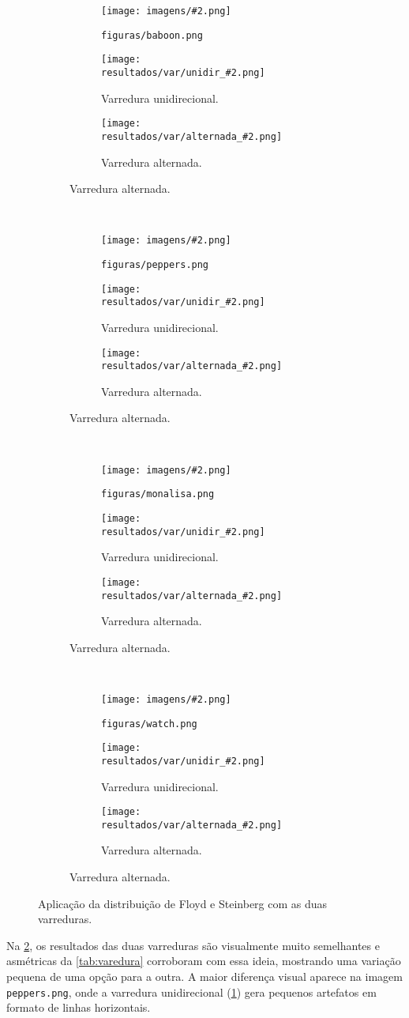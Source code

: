 \newcommand{\imagem}[2][]{
    \begin{subfigure}{\textwidth}
        \centering
        \begin{subfigure}{0.32\textwidth}
            \centering
            \texttt{[image: imagens/\#2.png]}
            \caption{\texttt{figuras/#2.png}}
        \end{subfigure}%
        \begin{subfigure}{0.32\textwidth}
            \centering
            \texttt{[image: resultados/var/unidir\_\#2.png]}
            \caption{Varredura unidirecional.}
            #1
        \end{subfigure}%
        \begin{subfigure}{0.32\textwidth}
            \centering
            \texttt{[image: resultados/var/alternada\_\#2.png]}
            \caption{Varredura alternada.}
        \end{subfigure}
    \end{subfigure}
}

\begin{figure}[H]
    \centering
    \imagem{baboon}\\[8pt]
    \imagem[\label{fig:resultado:peppers}]{peppers}\\[8pt]
    \imagem{monalisa}\\[8pt]
    \imagem{watch}

    \caption{Aplicação da distribuição de Floyd e Steinberg com as duas varreduras.}
    \label{fig:resultado:varredura}
\end{figure}

Na \cref{fig:resultado:varredura}, os resultados das duas varreduras são visualmente muito semelhantes e asmétricas da \cref{tab:varedura} corroboram com essa ideia, mostrando uma variação pequena de uma opção para a outra. A maior diferença visual aparece na imagem \texttt{peppers.png}, onde a varredura unidirecional (\ref{fig:resultado:peppers}) gera pequenos artefatos em formato de linhas horizontais.

